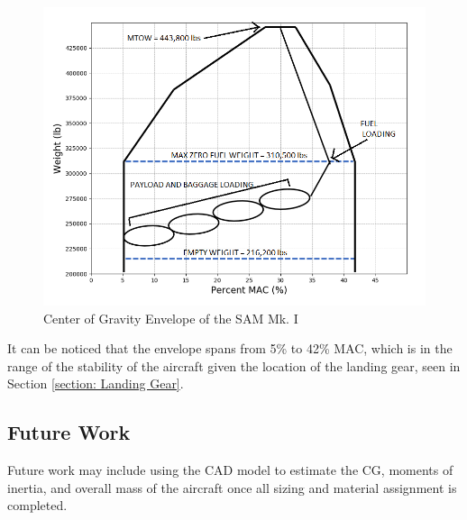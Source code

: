 \begin{figure}[!h]
    \centering
    \includegraphics[width=\linewidth]{Photos/massprops/CG Envelope.PNG}
    \caption{Center of Gravity Envelope of the SAM Mk. I}
    \label{fig:cg_envelope}
\end{figure}

It can be noticed that the envelope spans from 5\% to 42\% MAC, which is in the range of the stability of the aircraft given the location of the landing gear, seen in Section \ref{section: Landing Gear}.

\subsection{Future Work}
Future work may include using the CAD model to estimate the CG, moments of inertia, and overall mass of the aircraft once all sizing and material assignment is completed.

